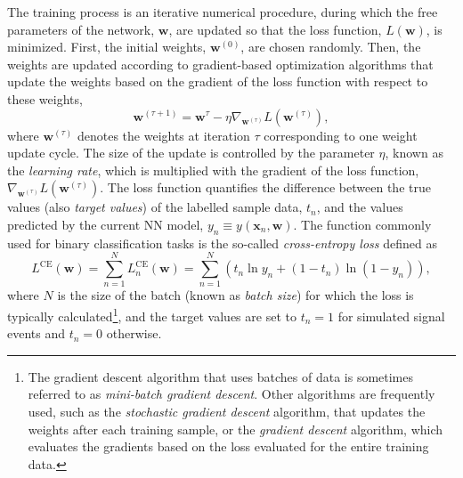 The training process is an iterative numerical procedure, during which the free parameters of the network, $\pmb{w}$, are updated so that the loss function, $L(\pmb{w})$, is minimized. 
First, the initial weights, $\pmb{w}^{(0)}$, are chosen randomly. Then, the weights are updated according to gradient-based optimization algorithms that update the weights based on the gradient of the loss function with respect to these weights, 
\begin{equation}
    \label{eq:gradient-descent}
    \pmb{w}^{(\tau+1)} = \pmb{w}^\tau - \eta \nabla_{\pmb{w}^{(\tau)}} L(\pmb{w}^{(\tau)}),
\end{equation}
where $\pmb{w}^{(\tau)}$ denotes the weights at iteration $\tau$ corresponding to one weight update cycle.
The size of the update is controlled by the parameter $\eta$, known as the \emph{learning rate}, which is multiplied with the gradient of the loss function, $\nabla_{\pmb{w}^{(\tau)}} L(\pmb{w}^{(\tau)})$.
The loss function quantifies the difference between the true values (also \emph{target values}) of the labelled sample data, $t_n$, and the values predicted by the current NN model, $y_n \equiv y(\pmb{x}_n, \pmb{w})$. 
The function commonly used for binary classification tasks is the so-called \emph{cross-entropy loss} defined as
\begin{equation}
    \label{eq:cross-entropy-loss}
    L^{\text{CE}}(\pmb{w}) = \sum _{n=1}^{N}L_n^{\text{CE}}(\pmb{w}) = \sum _{n=1}^{N}\left( t_n \ln y_n + ( 1 - t_n) \ln (1 - y_n) \right),
\end{equation}
where $N$ is the size of the batch (known as \emph{batch size}) for which the loss is typically calculated\footnote{The gradient descent algorithm that uses batches of data is sometimes referred to as \emph{mini-batch gradient descent}. Other algorithms are frequently used, such as the \emph{stochastic gradient descent} algorithm, that updates the weights after each training sample, or the \emph{gradient descent} algorithm, which evaluates the gradients based on the loss evaluated for the entire training data.}, and the target values are set to $t_n = 1$ for simulated signal events and $t_n = 0$ otherwise.
